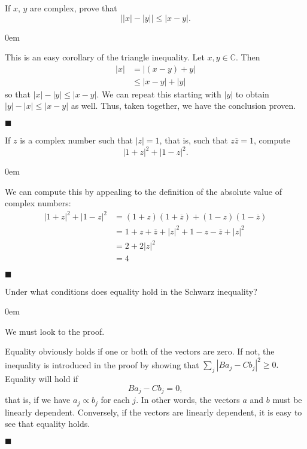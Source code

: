 \documentclass[12pt]{article}
\renewcommand{\qed}{\hfill$\blacksquare$}
\renewenvironment{proof}{\begin{addmargin}[1em]{0em}\begin{newproof}}{\end{newproof}\end{addmargin}\qed}
\newenvironment{problem}[2][Exercise]{\begin{trivlist}
\item[\hskip \labelsep {\bfseries #1}\hskip \labelsep {\bfseries #2.}]}{\end{trivlist}}
\begin{document}
\begin{problem}{1.13}
If $x$, $y$ are complex, prove that $$ \left| \left|x\right| - \left|y\right| \right| \leq \left|x-y\right|. $$
\end{problem}
\begin{proof}
This is an easy corollary of the triangle inequality. Let $x,y \in \mathbb{C}$. Then \begin{align*}
\left| x\right| & = \left| \left(x-y\right) + y\right| \\ & \leq \left|x-y\right| + \left|y\right| 
\end{align*}
so that $\left|x\right| - \left|y\right| \leq \left|x-y\right|$. We can repeat this starting with $\left|y\right|$ to obtain $\left|y\right| - \left|x\right| \leq \left|x-y\right|$ as well. Thus, taken together, we have the conclusion proven.
\end{proof}


\begin{problem}{1.14}
If $z$ is a complex number such that $\left|z\right|=1$, that is, such that $z\overline{z}=1$, compute $$ \left|1+z\right|^2 + \left|1-z\right|^2.$$
\end{problem}
\begin{proof}
We can compute this by appealing to the definition of the absolute value of complex numbers: \begin{align*}
\left|1+z\right|^2 + \left|1-z\right|^2 & = \left(1+z\right)\left(1+\overline{z}\right) + \left(1-z\right)\left(1-\overline{z}\right) \\ & = 1+z+\overline{z} + \left|z\right|^2 + 1 -z -\overline{z} + \left|z\right|^2 \\ & = 2 + 2\left|z\right|^2 \\ & = 4
\end{align*}
\end{proof}


\begin{problem}{1.15}
Under what conditions does equality hold in the Schwarz inequality?
\end{problem}
\begin{proof}
We must look to the proof.

Equality obviously holds if one or both of the vectors are zero. If not, the inequality is introduced in the proof by showing that $ \sum_j \left|Ba_j- Cb_j\right|^2 \geq 0.$ Equality will hold if $$ B a_j - Cb_j = 0, $$ that is, if we have $a_j \propto b_j$ for each $j$. In other words, the vectors $a$ and $b$ must be linearly dependent. Conversely, if the vectors are linearly dependent, it is easy to see that equality holds.
\end{proof}
\end{document}

